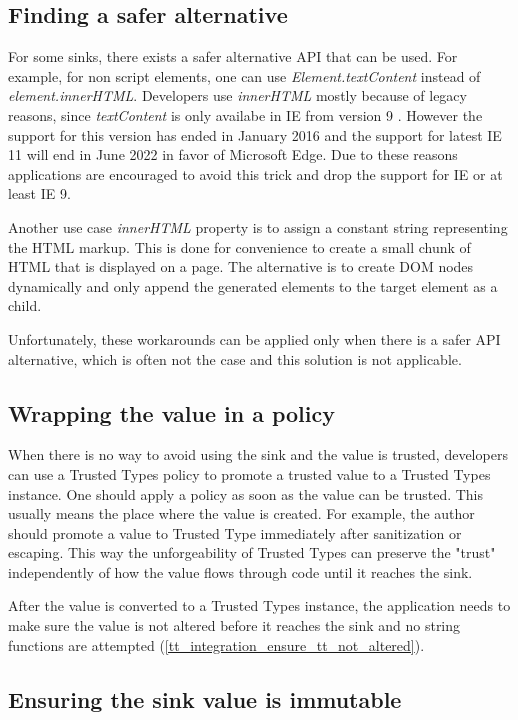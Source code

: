 \subsection{Finding a safer alternative}

For some sinks, there exists a safer alternative API that can be used. For example, for non script
elements, one can use \emph{Element.textContent} instead of \emph{element.innerHTML}. Developers use
\emph{innerHTML} mostly because of legacy reasons, since \emph{textContent} is only availabe in IE
from version 9 \cite{text_content_mdn}. However the support for this version has ended in January
2016 and the support for latest IE 11 will end in June 2022 in favor of Microsoft Edge. Due to these
reasons applications are encouraged to avoid this trick and drop the support for IE or at least IE
9.

Another use case \emph{innerHTML} property is to assign a constant string representing the HTML
markup. This is done for convenience to create a small chunk of HTML that is displayed on a page.
The alternative is to create DOM nodes dynamically and only append the generated elements to the
target element as a child.

Unfortunately, these workarounds can be applied only when there is a safer API alternative, which is
often not the case and this solution is not applicable.

\subsection{Wrapping the value in a policy}

When there is no way to avoid using the sink and the value is trusted, developers can use a Trusted
Types policy to promote a trusted value to a Trusted Types instance. One should apply a policy as
soon as the value can be trusted. This usually means the place where the value is created. For
example, the author should promote a value to Trusted Type immediately after sanitization or
escaping. This way the unforgeability of Trusted Types can preserve the "trust" independently of how
the value flows through code until it reaches the sink.

After the value is converted to a Trusted Types instance, the application needs to make sure the
value is not altered before it reaches the sink and no string functions are attempted
(\ref{tt_integration_ensure_tt_not_altered}).

\label{tt_integration_ensure_tt_not_altered}
\subsection{Ensuring the sink value is immutable}

